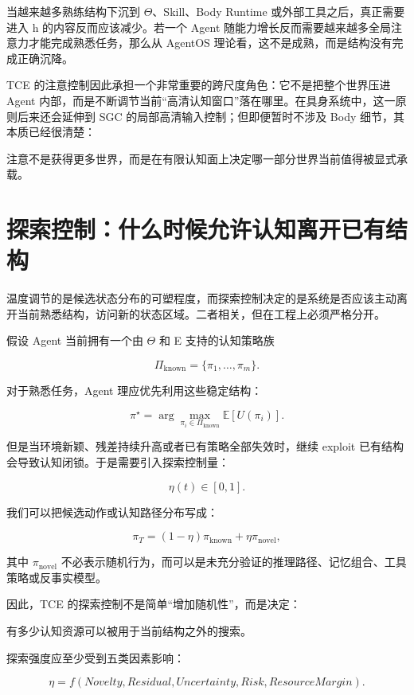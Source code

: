 当越来越多熟练结构下沉到 $\Theta$、Skill、Body Runtime 或外部工具之后，真正需要进入 h 的内容反而应该减少。若一个 Agent 随能力增长反而需要越来越多全局注意力才能完成熟悉任务，那么从 AgentOS 理论看，这不是成熟，而是结构没有完成正确沉降。

TCE 的注意控制因此承担一个非常重要的跨尺度角色：它不是把整个世界压进 Agent 内部，而是不断调节当前“高清认知窗口”落在哪里。在具身系统中，这一原则后来还会延伸到 SGC 的局部高清输入控制；但即便暂时不涉及 Body 细节，其本质已经很清楚：

\begin{proposition*}
注意不是获得更多世界，而是在有限认知面上决定哪一部分世界当前值得被显式承载。
\end{proposition*}

\section{探索控制：什么时候允许认知离开已有结构}

温度调节的是候选状态分布的可塑程度，而探索控制决定的是系统是否应该主动离开当前熟悉结构，访问新的状态区域。二者相关，但在工程上必须严格分开。

假设 Agent 当前拥有一个由 $\Theta$ 和 E 支持的认知策略族

\[
\Pi_{\mathrm{known}}
=
\{\pi_1,\ldots,\pi_m\}.
\]

对于熟悉任务，Agent 理应优先利用这些稳定结构：

\[
\pi^\star
=
\arg\max_{\pi_i\in\Pi_{\mathrm{known}}}
\mathbb E[U(\pi_i)].
\]

但是当环境新颖、残差持续升高或者已有策略全部失效时，继续 exploit 已有结构会导致认知闭锁。于是需要引入探索控制量：

\[
\eta(t)\in[0,1].
\]

我们可以把候选动作或认知路径分布写成：

\[
\pi_T
=
(1-\eta)\pi_{\mathrm{known}}
+
\eta\pi_{\mathrm{novel}},
\]

其中 $\pi_{\mathrm{novel}}$ 不必表示随机行为，而可以是未充分验证的推理路径、记忆组合、工具策略或反事实模型。

因此，TCE 的探索控制不是简单“增加随机性”，而是决定：

\begin{statementbox}
有多少认知资源可以被用于当前结构之外的搜索。
\end{statementbox}

探索强度应至少受到五类因素影响：

\[
\eta
=
f(
Novelty,
Residual,
Uncertainty,
Risk,
ResourceMargin
).
\]

